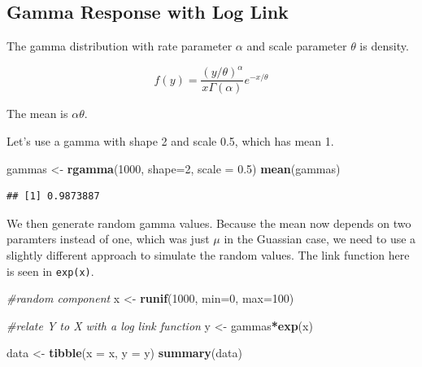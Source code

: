 \documentclass[openany]{book}
\newenvironment{Shaded}{\begin{snugshade}}{\end{snugshade}}
\newcommand{\CommentTok}[1]{\textcolor[rgb]{0.56,0.35,0.01}{\textit{#1}}}
\newcommand{\DataTypeTok}[1]{\textcolor[rgb]{0.13,0.29,0.53}{#1}}
\newcommand{\DecValTok}[1]{\textcolor[rgb]{0.00,0.00,0.81}{#1}}
\newcommand{\FloatTok}[1]{\textcolor[rgb]{0.00,0.00,0.81}{#1}}
\newcommand{\KeywordTok}[1]{\textcolor[rgb]{0.13,0.29,0.53}{\textbf{#1}}}
\newcommand{\NormalTok}[1]{#1}
\newcommand{\OperatorTok}[1]{\textcolor[rgb]{0.81,0.36,0.00}{\textbf{#1}}}
\newcommand{\StringTok}[1]{\textcolor[rgb]{0.31,0.60,0.02}{#1}}
\begin{document}
\hypertarget{gamma-response-with-log-link}{%
\subsection{Gamma Response with Log Link}\label{gamma-response-with-log-link}}

The gamma distribution with rate parameter \(\alpha\) and scale parameter \(\theta\) is density.

\[f(y) = \frac{(y/\theta)^\alpha}{x \Gamma(\alpha)}e^{-x/\theta}\]

The mean is \(\alpha\theta\).

Let's use a gamma with shape 2 and scale 0.5, which has mean 1.

\begin{Shaded}
\begin{Highlighting}[]
\NormalTok{gammas <-}\StringTok{ }\KeywordTok{rgamma}\NormalTok{(}\DecValTok{1000}\NormalTok{, }\DataTypeTok{shape=}\DecValTok{2}\NormalTok{, }\DataTypeTok{scale =} \FloatTok{0.5}\NormalTok{)}
\KeywordTok{mean}\NormalTok{(gammas)}
\end{Highlighting}
\end{Shaded}

\begin{verbatim}
## [1] 0.9873887
\end{verbatim}

We then generate random gamma values. Because the mean now depends on two paramters instead of one, which was just \(\mu\) in the Guassian case, we need to use a slightly different approach to simulate the random values. The link function here is seen in \texttt{exp(x)}.

\begin{Shaded}
\begin{Highlighting}[]
\CommentTok{#random component}
\NormalTok{x <-}\StringTok{ }\KeywordTok{runif}\NormalTok{(}\DecValTok{1000}\NormalTok{, }\DataTypeTok{min=}\DecValTok{0}\NormalTok{, }\DataTypeTok{max=}\DecValTok{100}\NormalTok{)}

\CommentTok{#relate Y to X with a log link function}
\NormalTok{y <-}\StringTok{ }\NormalTok{gammas}\OperatorTok{*}\KeywordTok{exp}\NormalTok{(x)}

\NormalTok{data <-}\StringTok{ }\KeywordTok{tibble}\NormalTok{(}\DataTypeTok{x =}\NormalTok{ x, }\DataTypeTok{y  =}\NormalTok{ y)}
\KeywordTok{summary}\NormalTok{(data)}
\end{Highlighting}
\end{Shaded}
\end{document}
